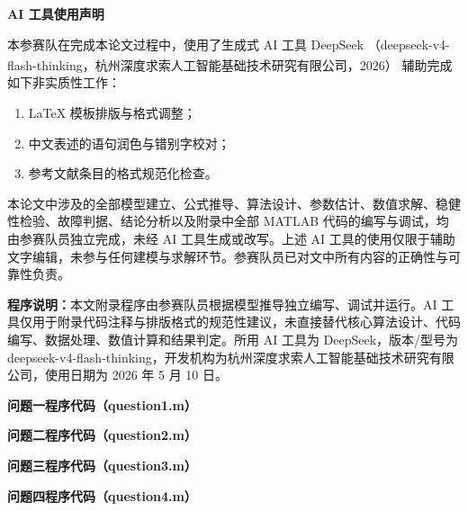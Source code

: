 \documentclass[a4paper]{nmmcm}
\newcommand{\upcite}[1]{\textsuperscript{\cite{#1}}}
\begin{document}
\noindent\textbf{AI 工具使用声明}

本参赛队在完成本论文过程中，使用了生成式 AI 工具 DeepSeek
（deepseek-v4-flash-thinking，杭州深度求索人工智能基础技术研究有限公司，2026）\upcite{13}
辅助完成如下非实质性工作：

\begin{enumerate}
    \item LaTeX 模板排版与格式调整；
    \item 中文表述的语句润色与错别字校对；
    \item 参考文献条目的格式规范化检查。
\end{enumerate}

本论文中涉及的全部模型建立、公式推导、算法设计、参数估计、数值求解、稳健性检验、故障判据、结论分析以及附录中全部 MATLAB 代码的编写与调试，均由参赛队员独立完成，未经 AI 工具生成或改写。上述 AI 工具的使用仅限于辅助文字编辑，未参与任何建模与求解环节。参赛队员已对文中所有内容的正确性与可靠性负责。

\newpage

\begin{appendices}

\noindent\textbf{程序说明：}本文附录程序由参赛队员根据模型推导独立编写、调试并运行。AI 工具仅用于附录代码注释与排版格式的规范性建议，未直接替代核心算法设计、代码编写、数据处理、数值计算和结果判定。所用 AI 工具为 DeepSeek，版本/型号为 deepseek-v4-flash-thinking，开发机构为杭州深度求索人工智能基础技术研究有限公司，使用日期为 2026 年 5 月 10 日。

\noindent\textbf{问题一程序代码（question1.m）}


\noindent\textbf{问题二程序代码（question2.m）}


\noindent\textbf{问题三程序代码（question3.m）}


\noindent\textbf{问题四程序代码（question4.m）}


\end{appendices}
\end{document}
